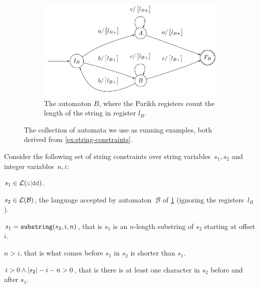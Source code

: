 \begin{figure}[ht]
  \medskip
  \begin{subfigure}[b]{0.7\textwidth}
    \centering
    \includegraphics[width=\textwidth]{b}
    \caption{The automaton $B$, where the Parikh registers count the length of
    the string in register $l_B$.}\label{fig:aut_b}
  \end{subfigure}
  \caption{The collection of automata we use as running
  examples, both derived from \cref{ex:string-constraints}.}\label{fig:examples}
\end{figure}


\begin{example}\label{ex:string-constraints} Consider the following set of
    string constraints over string variables~$s_1, s_2$ and integer
    variables~$n, i$:
\begin{constraints}
    \item\label{const:s1-in-c-dd} $s_1 \in \Language(\Regex{c\RegexOr{}dd})$.
    \item\label{const:s2-in-b} $s_2 \in \operatorname{\mathcal{L}}(\mathcal{B})$, the language accepted by
    automaton~$\mathcal{B}$ of \cref{fig:aut_b} (ignoring
    the registers~$l_B$).
    \item\label{const:s1-substring} $s_1 = \operatorname{\mathtt{substring}}(s_2, i, n)$, that is $s_1$ is an
    $n$-length substring of $s_2$ starting at offset $i$.
    \item\label{const:more-inside-than-before} $n > i$, that is what comes
    before $s_1$ in $s_2$ is shorter than $s_1$.
    \item\label{const:something-before-and-after} $i > 0 \land |s_2| -i -n > 0$, that
    is there is at least one character in $s_2$ before and after $s_1$.
\end{constraints}
\end{example}

